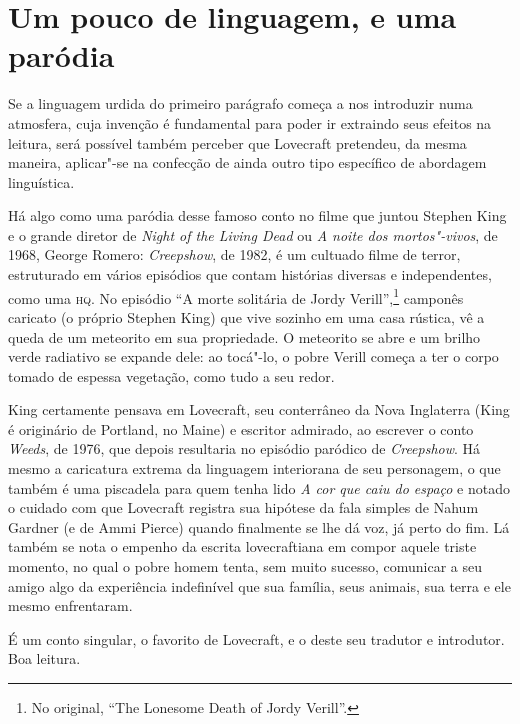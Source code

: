 \section*{Um pouco de linguagem, e uma paródia}

Se a linguagem urdida do primeiro parágrafo começa a nos introduzir numa
atmosfera, cuja invenção é fundamental para poder ir extraindo seus
efeitos na leitura, será possível também perceber que Lovecraft
pretendeu, da mesma maneira, aplicar"-se na confecção de ainda outro tipo
específico de abordagem linguística.

Há algo como uma paródia desse famoso conto no filme que juntou Stephen
King e o grande diretor de \textit{Night of the Living Dead} ou \textit{A noite dos
mortos"-vivos}, de 1968, George Romero: \textit{Creepshow}, de 1982, é um
cultuado filme de terror, estruturado em vários episódios que contam
histórias diversas e independentes, como uma \textsc{hq}. No episódio ``A morte solitária de Jordy Verill'',\footnote{No original, ``The Lonesome Death of Jordy Verill''.}
camponês caricato (o próprio Stephen King) que vive sozinho em uma casa
rústica, vê a queda de um meteorito em sua propriedade. O meteorito se
abre e um brilho verde radiativo se expande dele: ao tocá"-lo, o pobre
Verill começa a ter o corpo tomado de espessa vegetação, como tudo a seu
redor.

King certamente pensava em Lovecraft, seu conterrâneo da Nova Inglaterra
(King é originário de Portland, no Maine) e escritor admirado, ao
escrever o conto \textit{Weeds}, de 1976, que depois resultaria no
episódio paródico de \textit{Creepshow}. Há mesmo a caricatura extrema da
linguagem interiorana de seu personagem, o que também é uma piscadela
para quem tenha lido \textit{A cor que caiu do espaço} e notado o cuidado com
que Lovecraft registra sua hipótese da fala simples de Nahum Gardner (e
de Ammi Pierce) quando finalmente se lhe dá voz, já perto do fim. Lá
também se nota o empenho da escrita lovecraftiana em compor aquele
triste momento, no qual o pobre homem tenta, sem muito sucesso,
comunicar a seu amigo algo da experiência indefinível que sua família,
seus animais, sua terra e ele mesmo enfrentaram.

É um conto singular, o favorito de Lovecraft, e o deste seu tradutor e
introdutor. Boa leitura.

